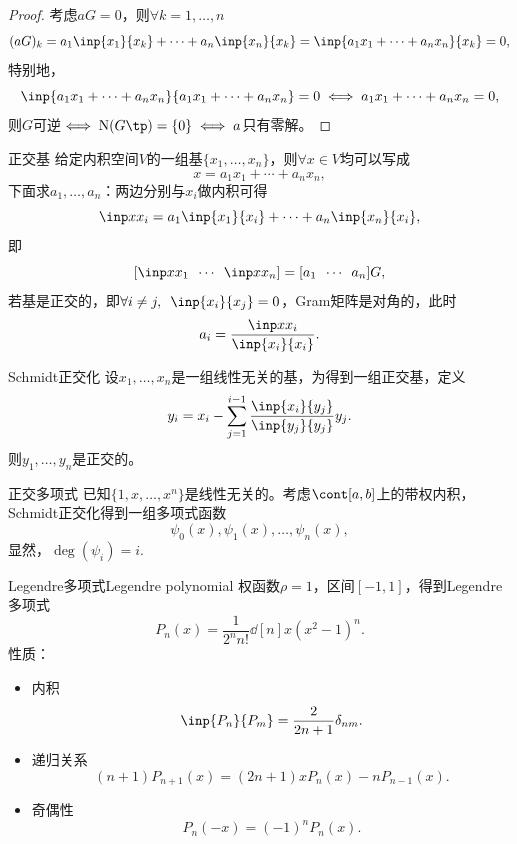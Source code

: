 \begin{proof}
    考虑$aG=0$，则$\forall k=1,\ldots,n$
    \[
        (aG)_k=a_1\inp{x_1}{x_k}+\cdots+a_n\inp{x_n}{x_k}=\inp{a_1x_1+\cdots+a_nx_n}{x_k}=0,
    \]
    特别地，
    \[
        \inp{a_1x_1+\cdots+a_nx_n}{a_1x_1+\cdots+a_nx_n}=0\iff a_1x_1+\cdots+a_nx_n=0,
    \]
    则$G$可逆$\iff \mathrm N(G\tp)=\{0\}\iff a$只有零解。
\end{proof}

\begin{example}
    {正交基}{}
    给定内积空间$V$的一组基$\{x_1,\ldots,x_n\}$，则$\forall x\in V$均可以写成
    \[
        x=a_1x_1+\cdots+a_nx_n,
    \]
    下面求$a_1,\ldots,a_n$：两边分别与$x_i$做内积可得
    \[
        \inp x{x_i}=a_1\inp{x_1}{x_i}+\cdots+a_n\inp{x_n}{x_i},
    \]
    即
    \[
        [\inp x{x_1}\enspace\cdots\enspace\inp x{x_n}]=[a_1\enspace\cdots\enspace a_n]G,
    \]
    若基是正交的，即$\forall i\neq j,\enspace\inp{x_i}{x_j}=0$，Gram矩阵是对角的，此时 
    \[
        a_i=\frac{\inp x{x_i}}{\inp{x_i}{x_i}}.
    \]
\end{example}

\begin{theorem}
    {Schmidt正交化}{}
    设$x_1,\ldots,x_n$是一组线性无关的基，为得到一组正交基，定义
    \begin{equation}
        y_i=x_i-\sum_{j=1}^{i-1}\frac{\inp{x_i}{y_j}}{\inp{y_j}{y_j}}y_j.
    \end{equation}
    则$y_1,\ldots,y_n$是正交的。
\end{theorem}

\begin{definition}
    {正交多项式}{}
    已知$\{1,x,\ldots,x^n\}$是线性无关的。考虑$\cont[a,b]$上的带权内积，Schmidt正交化得到一组多项式函数
    \[
        \psi_0(x),\psi_1(x),\ldots,\psi_n(x),
    \]
    显然，$\deg(\psi_i)=i.$
\end{definition}

\begin{example}
    {Legendre多项式}{Legendre polynomial}
    权函数$\rho=1$，区间$[-1,1]$，得到Legendre多项式
    \begin{equation}
        P_n(x)=\frac1{2^nn!}\dd[n]x(x^2-1)^n.
    \end{equation}
    性质：
    \begin{itemize}
        \item 内积 
        \begin{equation}
            \inp{P_n}{P_m}=\frac2{2n+1}\delta_{nm}.
        \end{equation}
        \item 递归关系
        \begin{equation}
            (n+1)P_{n+1}(x)=(2n+1)xP_n(x)-nP_{n-1}(x).
        \end{equation}
        \item 奇偶性
        \begin{equation}
            P_n(-x)=(-1)^nP_n(x).
        \end{equation}
    \end{itemize}
\end{example}

